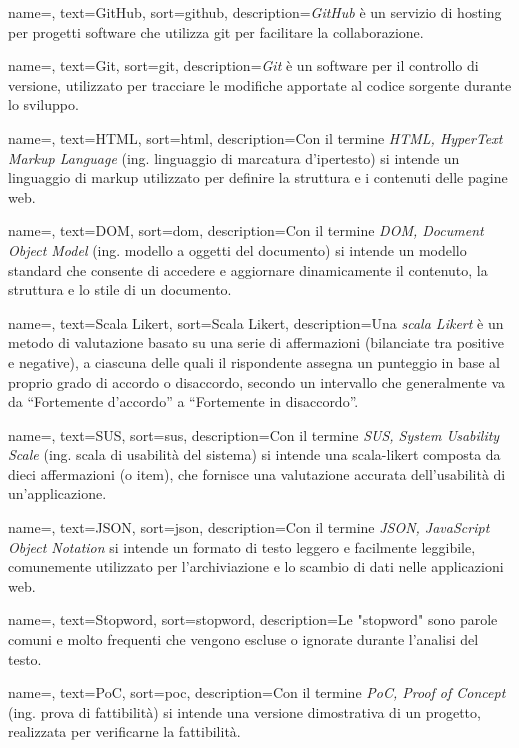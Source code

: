  {
    name=,
    text=GitHub,
    sort=github,
    description={\emph{GitHub} è un servizio di hosting per progetti software che utilizza \gls{git} per facilitare la collaborazione.}
}

 {
    name=,
    text=Git,
    sort=git,
    description={\emph{Git} è un software per il controllo di versione, utilizzato per tracciare le modifiche apportate al codice sorgente durante lo sviluppo.}
}

 {
    name=,
    text=HTML,
    sort=html,
    description={Con il termine \emph{HTML, HyperText Markup Language} (ing. linguaggio di marcatura d'ipertesto) si intende un linguaggio di markup utilizzato per definire la struttura e i contenuti delle pagine web.}
}

 {
    name=,
    text=DOM,
    sort=dom,
    description={Con il termine \emph{DOM, Document Object Model} (ing. modello a oggetti del documento) si intende un modello standard che consente di accedere e aggiornare dinamicamente il contenuto, la struttura e lo stile di un documento.}
}

 {
    name=,
    text=Scala Likert,
    sort=Scala Likert,
    description={Una \emph{scala Likert} è un metodo di valutazione basato su una serie di affermazioni (bilanciate tra positive e negative), a ciascuna delle quali il rispondente assegna un punteggio in base al proprio grado di accordo o disaccordo, secondo un intervallo che generalmente va da “Fortemente d'accordo” a “Fortemente in disaccordo”.}
}

 {
    name=,
    text=SUS,
    sort=sus,
    description={Con il termine \emph{SUS, System Usability Scale} (ing. scala di usabilità del sistema) si intende una \gls{scala-likert} composta da dieci affermazioni (o item), che fornisce una valutazione accurata dell'usabilità di un'applicazione.}
}

 {
    name=,
    text=JSON,
    sort=json,
    description={Con il termine \emph{JSON, JavaScript Object Notation} si intende un formato di testo leggero e facilmente leggibile, comunemente utilizzato per l’archiviazione e lo scambio di dati nelle applicazioni web.}
}

 {
    name=,
    text=Stopword,
    sort=stopword,
    description={Le "stopword" sono parole comuni e molto frequenti che vengono escluse o ignorate durante l’analisi del testo.}
}

 {
    name=,
    text=PoC,
    sort=poc,
    description={Con il termine \emph{PoC, Proof of Concept} (ing. prova di fattibilità) si intende una versione dimostrativa di un progetto, realizzata per verificarne la fattibilità.}
}
